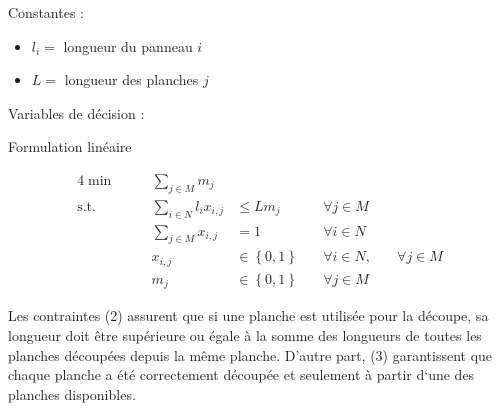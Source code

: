\documentclass{article}[A4]
\begin{document}
Constantes :
\begin{itemize}
    \item[] $l_{i} =$ longueur du panneau $i$
    \item[] $L =$ longueur des planches $j$
\end{itemize}

Variables de décision :
\begin{algorithm}[H]
\caption{Formulation linéaire}
\begin{alignat}{4}
    \min        &\quad& \sum\limits_{j \in M} m_{j}                        &                                   &\\
	\text{s.t.} &\quad& \sum\limits_{i \in N} l_{i} x_{i,j}                &\leq L m_{j}                       &\quad\forall j \in M\\ 
                &\quad& \sum\limits_{j \in M} x_{i,j}                      & = 1                               &\quad\forall i \in N\\
                &\quad& x_{i,j}                                            &\in \left\{0, 1\right\}            &\quad\forall i \in N, 	&\quad\forall j \in M\\
                &\quad& m_{j}                                              &\in \left\{0, 1\right\}            &\quad\forall j \in M
\end{alignat}
\end{algorithm}

Les contraintes (2) assurent que si une planche est utilisée pour la 
découpe, sa longueur doit être supérieure ou égale à la somme des 
longueurs de toutes les planches découpées depuis la même planche. 
D'autre part, (3) garantissent que chaque planche a été correctement 
découpée et seulement à partir d`une des planches disponibles.
\end{document}
